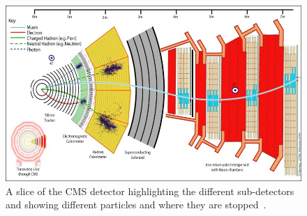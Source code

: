 \begin{figure}
\centering
\includegraphics[width=\linewidth]{Figures/CMSlayout.jpg}
\caption{A slice of the CMS detector highlighting the different sub-detectors and showing different particles and where they are stopped~\cite{Davis}.}
\label{fig:CMSlayout}
\end{figure}


